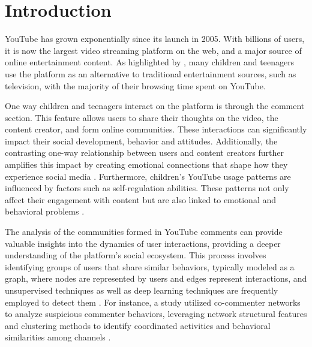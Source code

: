 \documentclass[sigconf]{acmart}
\begin{document}


\maketitle

\section{Introduction}
YouTube has grown exponentially since its launch in 2005. With billions of users, it is now the 
largest video streaming platform on the web, and a major source of online entertainment content. 
As highlighted by \cite{app13064044}, many children and teenagers use the platform as an alternative to 
traditional entertainment sources, such as television, with the majority of their 
browsing time spent on YouTube. 

One way children and teenagers interact on the platform is through the comment section. 
This feature allows users to share their thoughts on the video, the content creator, and form online 
communities. These interactions can significantly impact their social development, behavior and 
attitudes. Additionally, the contrasting one-way relationship between users and content creators 
further amplifies this impact by creating emotional connections that shape how they experience social
media \cite{lozano2023social}. 
Furthermore, children's YouTube usage patterns are influenced by factors such as self-regulation 
abilities. These patterns not only affect their engagement with content but are also linked to 
emotional and behavioral problems \cite{kim2024temperament} .

The analysis of the communities formed in YouTube comments can provide valuable 
insights into the dynamics of user interactions, providing a deeper understanding of 
the platform's social ecosystem. This process involves identifying groups of users that share similar
behaviors, typically modeled as a graph, where nodes are represented by users and edges represent 
interactions, and unsupervised techniques as well as deep learning techniques are frequently employed 
to detect them \cite{nooribakhsh2024community}. For instance, a study utilized co-commenter networks 
to analyze suspicious commenter behaviors, leveraging network structural features and clustering 
methods to identify coordinated activities and behavioral similarities among channels \cite{shajari2023} .
\end{document}

